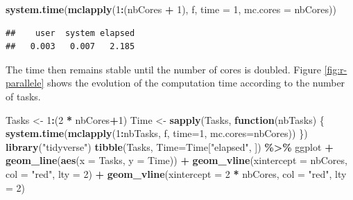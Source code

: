 \documentclass[
  12pt,
  american,
  a4paper,
  extrafontsizes,onecolumn,openright
  ]{memoir}
\newenvironment{Shaded}{\begin{snugshade}}{\end{snugshade}}
\newcommand{\AttributeTok}[1]{\textcolor[rgb]{0.13,0.29,0.53}{#1}}
\newcommand{\ControlFlowTok}[1]{\textcolor[rgb]{0.13,0.29,0.53}{\textbf{#1}}}
\newcommand{\DecValTok}[1]{\textcolor[rgb]{0.00,0.00,0.81}{#1}}
\newcommand{\FunctionTok}[1]{\textcolor[rgb]{0.13,0.29,0.53}{\textbf{#1}}}
\newcommand{\NormalTok}[1]{#1}
\newcommand{\OtherTok}[1]{\textcolor[rgb]{0.56,0.35,0.01}{#1}}
\newcommand{\SpecialCharTok}[1]{\textcolor[rgb]{0.81,0.36,0.00}{\textbf{#1}}}
\newcommand{\StringTok}[1]{\textcolor[rgb]{0.31,0.60,0.02}{#1}}
\begin{document}
\begin{Shaded}
\begin{Highlighting}[]
\FunctionTok{system.time}\NormalTok{(}\FunctionTok{mclapply}\NormalTok{(}\DecValTok{1}\SpecialCharTok{:}\NormalTok{(nbCores }\SpecialCharTok{+} \DecValTok{1}\NormalTok{), f, }\AttributeTok{time =} \DecValTok{1}\NormalTok{, }\AttributeTok{mc.cores =}\NormalTok{ nbCores))}
\end{Highlighting}
\end{Shaded}

\begin{verbatim}
##    user  system elapsed 
##   0.003   0.007   2.185
\end{verbatim}

\normalsize

The time then remains stable until the number of cores is doubled.
Figure \ref{fig:r-parallele} shows the evolution of the computation time according to the number of tasks.



\scriptsize

\begin{Shaded}
\begin{Highlighting}[]
\NormalTok{Tasks }\OtherTok{\textless{}{-}} \DecValTok{1}\SpecialCharTok{:}\NormalTok{(}\DecValTok{2} \SpecialCharTok{*}\NormalTok{ nbCores}\SpecialCharTok{+}\DecValTok{1}\NormalTok{)}
\NormalTok{Time }\OtherTok{\textless{}{-}} \FunctionTok{sapply}\NormalTok{(Tasks, }\ControlFlowTok{function}\NormalTok{(nbTasks) \{}
      \FunctionTok{system.time}\NormalTok{(}\FunctionTok{mclapply}\NormalTok{(}\DecValTok{1}\SpecialCharTok{:}\NormalTok{nbTasks, f, }\AttributeTok{time=}\DecValTok{1}\NormalTok{, }\AttributeTok{mc.cores=}\NormalTok{nbCores))}
\NormalTok{              \})}
\FunctionTok{library}\NormalTok{(}\StringTok{"tidyverse"}\NormalTok{)}
\FunctionTok{tibble}\NormalTok{(Tasks, }\AttributeTok{Time=}\NormalTok{Time[}\StringTok{"elapsed"}\NormalTok{, ]) }\SpecialCharTok{\%\textgreater{}\%} 
\NormalTok{  ggplot }\SpecialCharTok{+}
  \FunctionTok{geom\_line}\NormalTok{(}\FunctionTok{aes}\NormalTok{(}\AttributeTok{x =}\NormalTok{ Tasks, }\AttributeTok{y =}\NormalTok{ Time)) }\SpecialCharTok{+}
  \FunctionTok{geom\_vline}\NormalTok{(}\AttributeTok{xintercept =}\NormalTok{ nbCores, }\AttributeTok{col =} \StringTok{"red"}\NormalTok{, }\AttributeTok{lty =} \DecValTok{2}\NormalTok{) }\SpecialCharTok{+}
  \FunctionTok{geom\_vline}\NormalTok{(}\AttributeTok{xintercept =} \DecValTok{2} \SpecialCharTok{*}\NormalTok{ nbCores, }\AttributeTok{col =} \StringTok{"red"}\NormalTok{, }\AttributeTok{lty =} \DecValTok{2}\NormalTok{)}
\end{Highlighting}
\end{Shaded}
\end{document}
